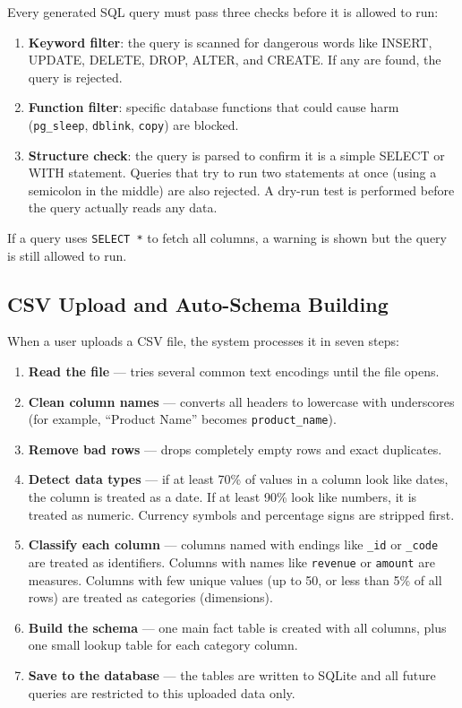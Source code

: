\documentclass[11pt,a4paper]{article}
\begin{document}
Every generated SQL query must pass three checks before it is allowed to run:
\begin{enumerate}[leftmargin=1.5em,itemsep=0pt,topsep=2pt]
\item \textbf{Keyword filter}: the query is scanned for dangerous words like INSERT,
      UPDATE, DELETE, DROP, ALTER, and CREATE. If any are found, the query is rejected.
\item \textbf{Function filter}: specific database functions that could cause harm
      (\texttt{pg\_sleep}, \texttt{dblink}, \texttt{copy}) are blocked.
\item \textbf{Structure check}: the query is parsed to confirm it is a simple SELECT
      or WITH statement. Queries that try to run two statements at once (using a
      semicolon in the middle) are also rejected. A dry-run test is performed
      before the query actually reads any data.
\end{enumerate}
If a query uses \texttt{SELECT *} to fetch all columns, a warning is shown but the query
is still allowed to run.

\subsection{CSV Upload and Auto-Schema Building}

When a user uploads a CSV file, the system processes it in seven steps:
\begin{enumerate}[leftmargin=1.5em,itemsep=0pt,topsep=2pt]
\item \textbf{Read the file} — tries several common text encodings until the file opens.
\item \textbf{Clean column names} — converts all headers to lowercase with underscores
      (for example, ``Product Name'' becomes \texttt{product\_name}).
\item \textbf{Remove bad rows} — drops completely empty rows and exact duplicates.
\item \textbf{Detect data types} — if at least 70\% of values in a column look like
      dates, the column is treated as a date. If at least 90\% look like numbers,
      it is treated as numeric. Currency symbols and percentage signs are stripped first.
\item \textbf{Classify each column} — columns named with endings like \texttt{\_id} or
      \texttt{\_code} are treated as identifiers. Columns with names like
      \texttt{revenue} or \texttt{amount} are measures. Columns with few unique values
      (up to 50, or less than 5\% of all rows) are treated as categories (dimensions).
\item \textbf{Build the schema} — one main fact table is created with all columns,
      plus one small lookup table for each category column.
\item \textbf{Save to the database} — the tables are written to SQLite and all future
      queries are restricted to this uploaded data only.
\end{enumerate}
\end{document}

